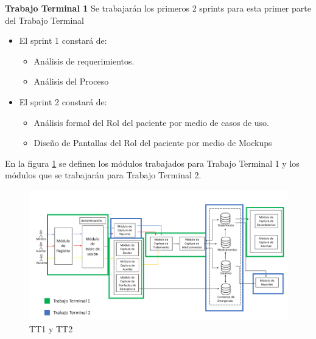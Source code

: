 \textbf{Trabajo Terminal 1}
Se trabajarán los primeros 2 sprints para esta primer parte del Trabajo Terminal
\begin{itemize}
	 
	\item El sprint 1 constará de:
	\begin{itemize}
		\item Análisis de requerimientos.
		\item Análisis del Proceso
	\end{itemize}
	
	\item El sprint 2 constará de:
	\begin{itemize}
		\item Análisis formal del Rol del paciente por medio de casos de uso.
		\item Diseño de Pantallas del Rol del paciente por medio de Mockups
	\end{itemize}
\end{itemize}

En la figura \ref{fig:arquitectura3} se definen los módulos trabajados para Trabajo Terminal 1 y los módulos que se trabajarán para Trabajo Terminal 2. 

\begin{figure}[htb]
	\centering
	\includegraphics[width=1\textwidth]{images/cap2/arquitectura3}
	\caption{TT1 y TT2} \label{fig:arquitectura3}
\end{figure}



